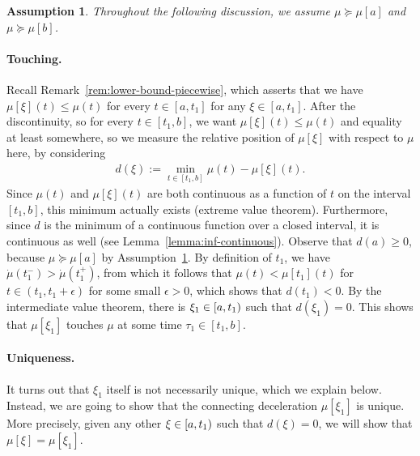 \documentclass[a4paper]{article}
\theoremstyle{definition}
\theoremstyle{plain}
\newtheorem{assump}{Assumption\hspace{0.25em}\ignorespaces}
\begin{document}
\begin{assump}\label{assump:smoothing}
  Throughout the following discussion, we assume $\mu \succeq \mu[a]$ and $\mu \succeq \mu[b]$.
\end{assump}



\paragraph{Touching.}
Recall Remark~\ref{rem:lower-bound-piecewise}, which asserts that we have
$\mu[\xi](t) \leq \mu(t)$ for every $t \in [a,t_{1}]$ for any $\xi \in [a, t_{1}]$.
%
After the discontinuity, so for every $t \in [t_{1}, b]$, we want
$\mu[\xi](t) \leq \mu(t)$ and equality at least somewhere, so we measure the relative
position of $\mu[\xi]$ with respect to $\mu$ here, by considering
\begin{align}
  d(\xi) := \min_{t \in [t_{1}, b]} \mu(t) - \mu[\xi](t) .
\end{align}
Since $\mu(t)$ and $\mu[\xi](t)$ are both continuous as a function of $t$ on the interval
$[t_{1}, b]$, this minimum actually exists (extreme value theorem).
%
Furthermore, since $d$ is the minimum of a continuous function over a closed
interval, it is continuous as well (see Lemma~\ref{lemma:inf-continuous}).
%
Observe that $d(a) \geq 0$, because $\mu \succeq \mu[a]$ by Assumption~\ref{assump:smoothing}.
%
By definition of $t_{1}$, we have $\dot{\mu}(t_{1}^{-}) > \dot{\mu}(t_{1}^{+})$,
from which it follows that $\mu(t) < \mu[t_{1}](t)$ for $ t\in (t_{1}, t_{1} + \epsilon)$ for some
small $\epsilon > 0$, which shows that $d(t_{1}) < 0$.
%
By the intermediate value theorem, there is $\xi_{1} \in [a,t_{1})$ such
that $d(\xi_{1}) = 0$.
%
This shows that $\mu[\xi_{1}]$ touches $\mu$ at some time
$\tau_{1} \in [t_{1}, b]$.


\paragraph{Uniqueness.}
It turns out that $\xi_{1}$ itself is not necessarily unique, which we explain
below. Instead, we are going to show that the connecting deceleration
$\mu[\xi_{1}]$ is unique. More precisely, given any other $\xi \in [a,t_{1})$ such
that $d(\xi) = 0$, we will show that $\mu[\xi] = \mu[\xi_{1}]$.
\end{document}
